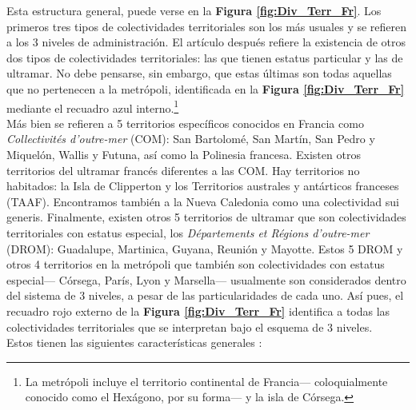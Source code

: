Esta estructura general, puede verse en la \textbf{Figura \ref{fig:Div_Terr_Fr}}. Los primeros tres tipos de colectividades territoriales son los más usuales y se refieren a los 3 niveles de administración. El artículo después refiere la existencia de otros dos tipos de colectividades territoriales: las que tienen estatus particular y las de ultramar. No debe pensarse, sin embargo, que estas últimas son todas aquellas que no pertenecen a la metrópoli, identificada en la \textbf{Figura \ref{fig:Div_Terr_Fr}} mediante el recuadro azul interno.\footnote{La metrópoli incluye el territorio continental de Francia--- coloquialmente conocido como el Hexágono, por su forma--- y la isla de Córsega.}\\ 

Más bien se refieren a 5 territorios específicos conocidos en Francia como \textit{Collectivités d'outre-mer} (COM): San Bartolomé, San Martín, San Pedro y Miquelón, Wallis y Futuna, así como la Polinesia francesa. Existen otros territorios del ultramar francés diferentes a las COM. Hay territorios no habitados: la Isla de Clipperton y los Territorios australes y antárticos franceses (TAAF). Encontramos también a la Nueva Caledonia como una colectividad sui generis. Finalmente, existen otros 5 territorios de ultramar que son colectividades territoriales con estatus especial, los \textit{Départements et Régions d'outre-mer} (DROM): Guadalupe, Martinica, Guyana, Reunión y Mayotte. Estos 5 DROM y otros 4 territorios en la metrópoli que también son colectividades con estatus especial--- Córsega, París, Lyon y Marsella--- usualmente son considerados dentro del sistema de 3 niveles, a pesar de las particularidades de cada uno. Así pues, el recuadro rojo externo de la \textbf{Figura \ref{fig:Div_Terr_Fr}} identifica a todas las colectividades territoriales que se interpretan bajo el esquema de 3 niveles.\\

Estos tienen las siguientes características generales \parencite{AN17b}: 

